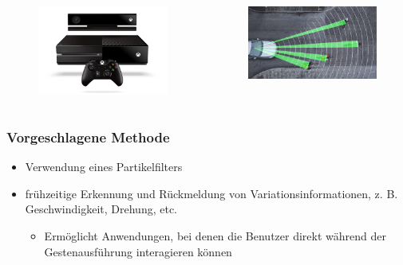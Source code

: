 \documentclass{beamer}
\begin{document}
\begin{frame}
\begin{itemize}
\begin{itemize}
\end{itemize}
\end{itemize}
\begin{columns}
\begin{column}{0.4\textwidth}
\begin{figure}
\centering
\includegraphics[width=0.7\linewidth]{../Bilder/xbox}
\label{fig:xbox}
\end{figure}
\end{column}
\begin{column}{0.4\textwidth}
\begin{figure}
\centering
\includegraphics[width=0.7\linewidth]{../Bilder/fussgaenger}
\label{fig:fussgaenger}
\end{figure}
\end{column}
\end{columns}
\end{frame}
\begin{frame}\frametitle{Vorgeschlagene Methode}
\begin{itemize}
\item Verwendung eines Partikelfilters
\item frühzeitige Erkennung und Rückmeldung von Variationsinformationen, z. B. Geschwindigkeit, Drehung, etc.
\begin{itemize}
\item Ermöglicht Anwendungen, bei denen die Benutzer direkt während der Gestenausführung interagieren können
\end{itemize}
\end{itemize}
\end{frame}
\end{document}
